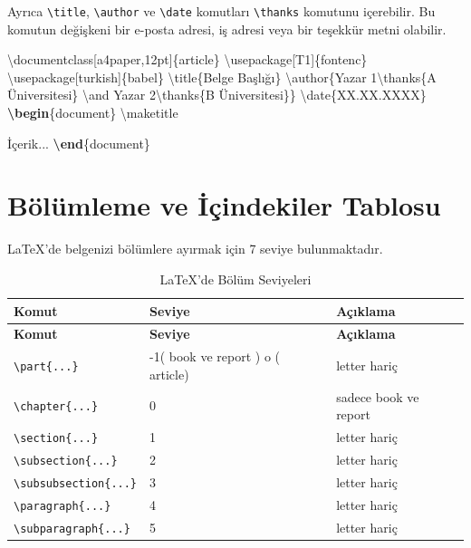 \documentclass[
  10pt,
]{scrbook}
\newenvironment{Shaded}{\begin{snugshade}}{\end{snugshade}}
\newcommand{\BuiltInTok}[1]{#1}
\newcommand{\ExtensionTok}[1]{#1}
\newcommand{\FunctionTok}[1]{\textcolor[rgb]{0.00,0.00,0.00}{#1}}
\newcommand{\KeywordTok}[1]{\textcolor[rgb]{0.13,0.29,0.53}{\textbf{#1}}}
\newcommand{\NormalTok}[1]{#1}
\theoremstyle{definition}
\theoremstyle{definition}
\theoremstyle{definition}
\theoremstyle{definition}
\theoremstyle{remark}
\begin{document}
Ayrıca \texttt{\textbackslash{}title}, \texttt{\textbackslash{}author} ve \texttt{\textbackslash{}date} komutları \texttt{\textbackslash{}thanks} komutunu içerebilir. Bu komutun değişkeni bir e-posta adresi, iş adresi veya bir teşekkür metni olabilir.

\begin{Shaded}
\begin{Highlighting}[]
\BuiltInTok{\textbackslash{}documentclass}\NormalTok{[a4paper,12pt]\{}\ExtensionTok{article}\NormalTok{\}}
\BuiltInTok{\textbackslash{}usepackage}\NormalTok{[T1]\{}\ExtensionTok{fontenc}\NormalTok{\}}
\BuiltInTok{\textbackslash{}usepackage}\NormalTok{[turkish]\{}\ExtensionTok{babel}\NormalTok{\}}
\FunctionTok{\textbackslash{}title}\NormalTok{\{Belge Başlığı\}}
\FunctionTok{\textbackslash{}author}\NormalTok{\{Yazar 1}\FunctionTok{\textbackslash{}thanks}\NormalTok{\{A Üniversitesi\} }\FunctionTok{\textbackslash{}and}\NormalTok{ Yazar 2}\FunctionTok{\textbackslash{}thanks}\NormalTok{\{B Üniversitesi\}\}}
\FunctionTok{\textbackslash{}date}\NormalTok{\{XX.XX.XXXX\}}
\KeywordTok{\textbackslash{}begin}\NormalTok{\{}\ExtensionTok{document}\NormalTok{\}}
\FunctionTok{\textbackslash{}maketitle}

\NormalTok{  İçerik...}
\KeywordTok{\textbackslash{}end}\NormalTok{\{}\ExtensionTok{document}\NormalTok{\}}
\end{Highlighting}
\end{Shaded}

\hypertarget{buxf6luxfcmleme-ve-iuxe7indekiler-tablosu}{%
\section{Bölümleme ve İçindekiler Tablosu}\label{buxf6luxfcmleme-ve-iuxe7indekiler-tablosu}}

LaTeX'de belgenizi bölümlere ayırmak için 7 seviye bulunmaktadır.

\begin{longtable}[]{@{}lll@{}}
\caption{\label{tab:bolsev} LaTeX'de Bölüm Seviyeleri}\tabularnewline
\toprule
\textbf{Komut} & \textbf{Seviye} & \textbf{Açıklama} \\
\midrule
\endfirsthead
\toprule
\textbf{Komut} & \textbf{Seviye} & \textbf{Açıklama} \\
\midrule
\endhead
\texttt{\textbackslash{}part\{...\}} & -1( book ve report ) o ( article) & letter hariç \\
\texttt{\textbackslash{}chapter\{...\}} & 0 & sadece book ve report \\
\texttt{\textbackslash{}section\{...\}} & 1 & letter hariç \\
\texttt{\textbackslash{}subsection\{...\}} & 2 & letter hariç \\
\texttt{\textbackslash{}subsubsection\{...\}} & 3 & letter hariç \\
\texttt{\textbackslash{}paragraph\{...\}} & 4 & letter hariç \\
\texttt{\textbackslash{}subparagraph\{...\}} & 5 & letter hariç \\
\bottomrule
\end{longtable}
\end{document}
